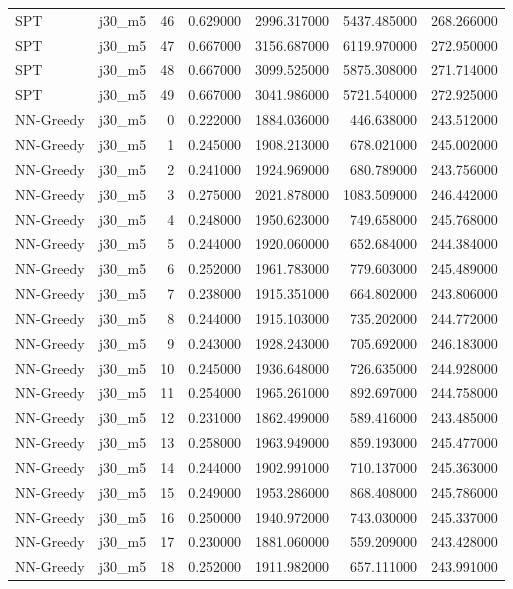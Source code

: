 \begin{tabular}{llrrrrr}
SPT & j30_m5 & 46 & 0.629000 & 2996.317000 & 5437.485000 & 268.266000 \\
SPT & j30_m5 & 47 & 0.667000 & 3156.687000 & 6119.970000 & 272.950000 \\
SPT & j30_m5 & 48 & 0.667000 & 3099.525000 & 5875.308000 & 271.714000 \\
SPT & j30_m5 & 49 & 0.667000 & 3041.986000 & 5721.540000 & 272.925000 \\
NN-Greedy & j30_m5 & 0 & 0.222000 & 1884.036000 & 446.638000 & 243.512000 \\
NN-Greedy & j30_m5 & 1 & 0.245000 & 1908.213000 & 678.021000 & 245.002000 \\
NN-Greedy & j30_m5 & 2 & 0.241000 & 1924.969000 & 680.789000 & 243.756000 \\
NN-Greedy & j30_m5 & 3 & 0.275000 & 2021.878000 & 1083.509000 & 246.442000 \\
NN-Greedy & j30_m5 & 4 & 0.248000 & 1950.623000 & 749.658000 & 245.768000 \\
NN-Greedy & j30_m5 & 5 & 0.244000 & 1920.060000 & 652.684000 & 244.384000 \\
NN-Greedy & j30_m5 & 6 & 0.252000 & 1961.783000 & 779.603000 & 245.489000 \\
NN-Greedy & j30_m5 & 7 & 0.238000 & 1915.351000 & 664.802000 & 243.806000 \\
NN-Greedy & j30_m5 & 8 & 0.244000 & 1915.103000 & 735.202000 & 244.772000 \\
NN-Greedy & j30_m5 & 9 & 0.243000 & 1928.243000 & 705.692000 & 246.183000 \\
NN-Greedy & j30_m5 & 10 & 0.245000 & 1936.648000 & 726.635000 & 244.928000 \\
NN-Greedy & j30_m5 & 11 & 0.254000 & 1965.261000 & 892.697000 & 244.758000 \\
NN-Greedy & j30_m5 & 12 & 0.231000 & 1862.499000 & 589.416000 & 243.485000 \\
NN-Greedy & j30_m5 & 13 & 0.258000 & 1963.949000 & 859.193000 & 245.477000 \\
NN-Greedy & j30_m5 & 14 & 0.244000 & 1902.991000 & 710.137000 & 245.363000 \\
NN-Greedy & j30_m5 & 15 & 0.249000 & 1953.286000 & 868.408000 & 245.786000 \\
NN-Greedy & j30_m5 & 16 & 0.250000 & 1940.972000 & 743.030000 & 245.337000 \\
NN-Greedy & j30_m5 & 17 & 0.230000 & 1881.060000 & 559.209000 & 243.428000 \\
NN-Greedy & j30_m5 & 18 & 0.252000 & 1911.982000 & 657.111000 & 243.991000 \\

\end{tabular}
